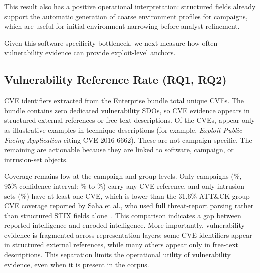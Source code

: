 \documentclass[sigconf,anonymous,review]{acmart}
\begin{document}
This result also has a positive operational interpretation: structured fields already support the automatic generation of coarse environment profiles for \campaignsuttiercoarsecount{} campaigns, which are useful for initial environment narrowing before analyst refinement.

Given this software-specificity bottleneck, we next measure how often vulnerability evidence can provide exploit-level anchors.

\subsection{Vulnerability Reference Rate (RQ1, RQ2)}

CVE identifiers extracted from the Enterprise bundle total \cveuniquecount{} unique CVEs. The bundle contains zero dedicated vulnerability SDOs, so CVE evidence appears in structured external references or free-text descriptions. Of the \cveuniquecount{} CVEs, \cvetechniqueonlycount{} appear only as illustrative examples in technique descriptions (for example, \emph{Exploit Public-Facing Application} citing CVE-2016-6662). These are not campaign-specific. The remaining \cveactionablecount{} are actionable because they are linked to software, campaign, or intrusion-set objects.

Coverage remains low at the campaign and group levels. Only \entcampaignswithcvecount{} campaigns (\entcampaignswithcvepct\%, 95\% confidence interval: \entcampaignswithcvecilow{}\% to \entcampaignswithcvecihigh{}\%) carry any CVE reference, and only \entintrusionsetswithcvecount{} intrusion sets (\entintrusionsetswithcvepct\%) have at least one CVE, which is lower than the 31.6\% ATT\&CK-group CVE coverage reported by Saha et al., who used full threat-report parsing rather than structured STIX fields alone~\cite{DBLP:conf/uss/SahaMBCVL25}. This comparison indicates a gap between reported intelligence and encoded intelligence. More importantly, vulnerability evidence is fragmented across representation layers: some CVE identifiers appear in structured external references, while many others appear only in free-text descriptions. This separation limits the operational utility of vulnerability evidence, even when it is present in the corpus.
\end{document}
